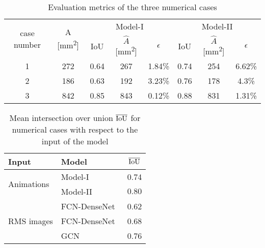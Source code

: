 \begin{sloppypar}
\begin{table}[ht!]
		\caption{Evaluation metrics of the three numerical cases}
		\begin{tabular}{cccccccc}
			\toprule
			\multirow{2}{*}{case number} & \multicolumn{1}{c}{\multirow{2}{*}{A [mm\textsuperscript{2}]}} & \multicolumn{3}{c}{Model-I} & \multicolumn{3}{c}{Model-II} \\ \cmidrule(lr){3-5} \cmidrule(lr){6-8} 
			& \multicolumn{1}{c}{}  & \multicolumn{1}{c}{IoU}  & \multicolumn{1}{c}{\(\hat{A}\) [mm\textsuperscript{2}]} & \(\epsilon\) & \multicolumn{1}{c}{IoU}  & \multicolumn{1}{c}{\(\hat{A}\) [mm\textsuperscript{2}]} & \(\epsilon\) \\ 
			\midrule
			1 & 272 & \multicolumn{1}{c}{0.64} & \multicolumn{1}{c}{267} & 1.84\% & \multicolumn{1}{c}{0.74} & \multicolumn{1}{c}{254} & 6.62\% \\ 
			2 &  186  & \multicolumn{1}{c}{0.63} & \multicolumn{1}{c}{192} & 3.23\% & \multicolumn{1}{c}{0.76} & \multicolumn{1}{c}{178} & 4.3\% \\ 
			3 & 842 & \multicolumn{1}{c}{0.85} &\multicolumn{1}{c}{843} & 0.12\%   & \multicolumn{1}{c}{0.88} & \multicolumn{1}{c}{831} & 1.31\% \\ 
			\bottomrule
		\end{tabular}	
		\label{tab:num_cases}
	\end{table}

	\begin{table}[ht!]
		\centering
		\caption{Mean intersection over union $\overline{\textup{IoU}}$ for numerical cases with respect to the input of the model}
		\begin{tabular}{llc}
			\toprule
			Input & Model & $\overline{\textup{IoU}}$ \\ 
			\midrule
			\multirow{2}{*}{Animations} & Model-I & 0.74 \\ & Model-II                    & \(0.80\)    \\ \midrule
			\multirow{3}{*}{RMS images}  & FCN-DenseNet~\cite{Ijjeh2021} & 0.62     \\
			& FCN-DenseNet~\cite{Ijjeh2022} & 0.68     \\
			& GCN~\cite{Ijjeh2022}          & 0.76     \\ 
			\bottomrule
		\end{tabular}
		\label{tab:meanIoU_vs_input}
	\end{table}

	
	\clearpage

\end{sloppypar}
